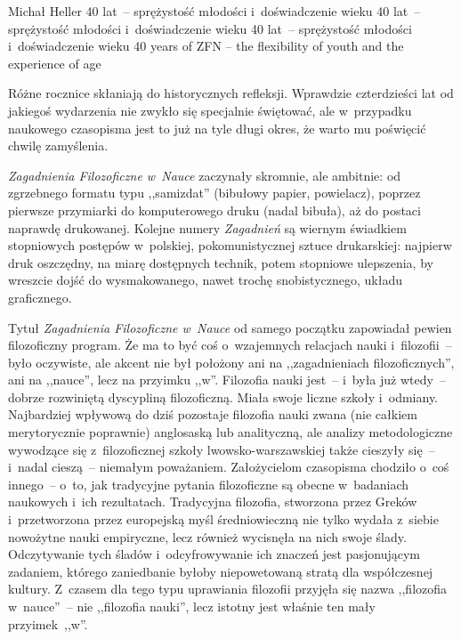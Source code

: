 \begin{editorial}{Michał Heller}
	{40 lat~-- sprężystość młodości i~doświadczenie wieku}
	{40 lat~-- sprężystość młodości i~doświadczenie wieku}
	{40 lat~-- sprężystość młodości i~doświadczenie wieku}
	{40 years of ZFN – the flexibility of youth and the experience of age}




\lettrine[loversize=0.13,lines=2,lraise=-0.03,nindent=0em,findent=0.2pt]%
{R}{}óżne rocznice skłaniają do historycznych refleksji. Wprawdzie czterdzieści lat od jakiegoś wydarzenia nie zwykło
się specjalnie świętować, ale w~przypadku naukowego czasopisma jest to już na tyle długi okres, że warto mu poświęcić
chwilę zamyślenia.

\textit{Zagadnienia Filozoficzne w~Nauce} zaczynały skromnie, ale ambitnie: od zgrzebnego formatu typu ,,samizdat''
(bibułowy papier, powielacz), poprzez pierwsze przymiarki do komputerowego druku (nadal bibuła), aż do postaci naprawdę
drukowanej. Kolejne numery \textit{Zagadnień} są wiernym świadkiem stopniowych postępów w~polskiej, pokomunistycznej
sztuce drukarskiej: najpierw druk oszczędny, na miarę dostępnych technik, potem stopniowe ulepszenia, by wreszcie dojść
do wysmakowanego, nawet trochę snobistycznego, układu graficznego.

Tytuł \textit{Zagadnienia Filozoficzne w~Nauce} od samego początku zapowiadał pewien filozoficzny program. Że ma to
być coś o~wzajemnych relacjach nauki i~filozofii~-- było oczywiste, ale akcent nie był położony ani na ,,zagadnieniach
filozoficznych'', ani na ,,nauce'', lecz na przyimku ,,w''. Filozofia nauki jest~-- i~była już wtedy~-- dobrze rozwiniętą
dyscypliną filozoficzną. Miała swoje liczne szkoły i~odmiany. Najbardziej wpływową do dziś pozostaje filozofia nauki
zwana (nie całkiem merytorycznie poprawnie) anglosaską lub analityczną, ale analizy metodologiczne wywodzące się z~filozoficznej
szkoły lwowsko-warszawskiej także cieszyły się~-- i~nadal cieszą~-- niemałym poważaniem. Założycielom
czasopisma chodziło o~coś innego~-- o~to, jak tradycyjne pytania filozoficzne są obecne w~badaniach naukowych i~ich
rezultatach. Tradycyjna filozofia, stworzona przez Greków i~przetworzona przez europejską myśl średniowieczną nie tylko
wydała z~siebie nowożytne nauki empiryczne, lecz również wycisnęła na nich swoje ślady. Odczytywanie tych śladów i~odcyfrowywanie
ich znaczeń jest pasjonującym zadaniem, którego zaniedbanie byłoby niepowetowaną stratą dla współczesnej
kultury. Z~czasem dla tego typu uprawiania filozofii przyjęła się nazwa ,,filozofia w~nauce''~-- nie ,,filozofia nauki'',
lecz istotny jest właśnie ten mały przyimek~,,w''.


\end{editorial}
